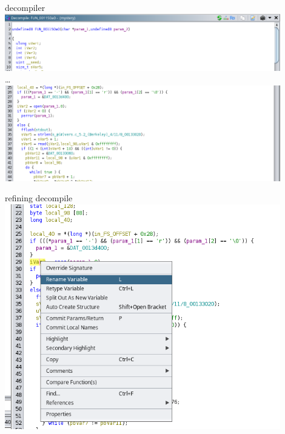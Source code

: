 \begin{frame}{decompiler}
\includegraphics[width=0.9\textwidth]{decomp-top} \\
\ldots  \\
\includegraphics[width=0.9\textwidth]{decomp-rest}
\end{frame}

\begin{frame}{refining decompile}
\includegraphics[width=0.9\textwidth]{ghidra-edit-var-decomp}
\end{frame}

